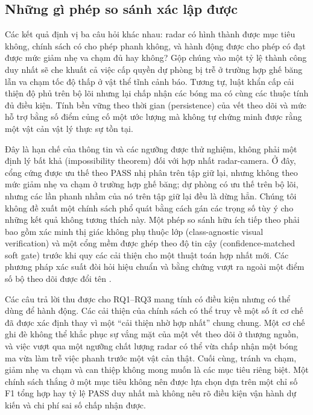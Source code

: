 \documentclass[11pt,a4paper]{article}
\begin{document}
\subsection{Những gì phép so sánh xác lập được}
Các kết quả định vị ba câu hỏi khác nhau: radar có hình thành được mục tiêu
không, chính sách có cho phép phanh không, và hành động được cho phép có đạt
được mức giảm nhẹ va chạm đủ hay không? Gộp chúng vào một tỷ lệ thành công duy
nhất sẽ che khuất cả việc cấp quyền dự phòng bị trễ ở trường hợp ghế băng lẫn va chạm tốc
độ thấp ở vật thể tĩnh cảnh báo. Tương tự, luật khẩn cấp cải thiện độ phủ trên
bộ lõi nhưng lại chấp nhận các bóng ma có cùng các thuộc tính đủ điều kiện.
Tính bền vững theo thời gian (persistence) của vết theo dõi và mức hỗ trợ bằng
số điểm củng cố một ước lượng mà không tự chứng minh được rằng một vật cản vật
lý thực sự tồn tại.

Đây là hạn chế của thông tin và các ngưỡng được thử nghiệm, không phải một định
lý bất khả (impossibility theorem) đối với hợp nhất radar-camera. Ở đây, cổng
cứng được ưu thế theo PASS nhị phân trên tập giữ lại, nhưng không theo mức giảm
nhẹ va chạm ở trường hợp ghế băng; dự phòng có ưu thế trên bộ lõi, nhưng các
lần phanh nhầm của nó trên tập giữ lại đều là dừng hẳn. Chúng tôi không đề
xuất một chính sách phổ quát bằng cách gán các trọng số tùy ý cho những kết
quả không tương thích này. Một phép so sánh hữu ích tiếp theo phải bao gồm xác
minh thị giác không phụ thuộc lớp (class-agnostic visual verification) và một
cổng mềm được ghép theo độ tin cậy (confidence-matched soft gate) trước khi
quy các cải thiện cho một thuật toán hợp nhất mới. Các phương pháp xác suất
đòi hỏi hiệu chuẩn và bằng chứng vượt ra ngoài một điểm số bộ theo dõi được
đổi tên \cite{sandblom2011threat,lindenmaier2022existence}.

Các câu trả lời thu được cho RQ1--RQ3 mang tính có điều kiện nhưng có thể dùng
để hành động. Các cải thiện của chính sách có thể truy về một số ít cơ chế đã
được xác định thay vì một ``cải thiện nhờ hợp nhất'' chung chung. Một cơ chế
ghi đè không thể khắc phục sự vắng mặt của một vết theo dõi ở thượng nguồn, và
việc vượt qua một ngưỡng chất lượng radar có thể vừa chấp nhận một bóng ma vừa
làm trễ việc phanh trước một vật cản thật. Cuối cùng, tránh va chạm, giảm nhẹ
va chạm và can thiệp không mong muốn là các mục tiêu riêng biệt. Một chính
sách thắng ở một mục tiêu không nên được lựa chọn dựa trên một chỉ số F1 tổng
hợp hay tỷ lệ PASS duy nhất mà không nêu rõ điều kiện vận hành dự kiến và chi
phí sai số chấp nhận được.
\end{document}
